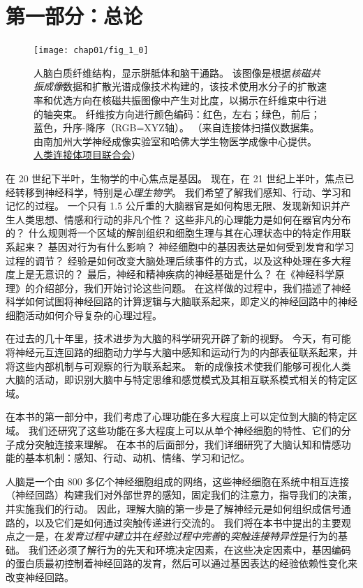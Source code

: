 \chapter*{第一部分：总论}

\begin{figure}[htbp]
	\centering
	\texttt{[image: chap01/fig\_1\_0]}
	\caption{人脑白质纤维结构，显示胼胝体和脑干通路。
		该图像是根据\textit{核磁共振成像}数据和扩散光谱成像技术构建的，该技术使用水分子的扩散速率和优选方向在核磁共振图像中产生对比度，以揭示在纤维束中行进的轴突束。
		纤维按方向进行颜色编码：红色，左右；绿色，前后；蓝色，升序-降序（RGB=XYZ轴）。
		（来自连接体扫描仪数据集。
		由南加州大学神经成像实验室和哈佛大学生物医学成像中心提供。
		\href{www.humanconnetomproject.org}{人类连接体项目联合会}）}
	\label{fig:1_0}
\end{figure}

在 20 世纪下半叶，生物学的中心焦点是基因。
现在，在 21 世纪上半叶，焦点已经转移到神经科学，特别是\textit{心理生物学}。
我们希望了解我们感知、行动、学习和记忆的过程。
一个只有 1.5 公斤重的大脑器官是如何构思无限、发现新知识并产生人类思想、情感和行动的非凡个性？
这些非凡的心理能力是如何在器官内分布的？
什么规则将一个区域的解剖组织和细胞生理与其在心理状态中的特定作用联系起来？
基因对行为有什么影响？
神经细胞中的基因表达是如何受到发育和学习过程的调节？
经验是如何改变大脑处理后续事件的方式，以及这种处理在多大程度上是无意识的？
最后，神经和精神疾病的神经基础是什么？
在《神经科学原理》的介绍部分，我们开始讨论这些问题。
在这样做的过程中，我们描述了神经科学如何试图将神经回路的计算逻辑与大脑联系起来，即定义的神经回路中的神经细胞活动如何介导复杂的心理过程。


在过去的几十年里，技术进步为大脑的科学研究开辟了新的视野。
今天，有可能将神经元互连回路的细胞动力学与大脑中感知和运动行为的内部表征联系起来，并将这些内部机制与可观察的行为联系起来。
新的成像技术使我们能够可视化人类大脑的活动，即识别大脑中与特定思维和感觉模式及其相互联系模式相关的特定区域。


在本书的第一部分中，我们考虑了心理功能在多大程度上可以定位到大脑的特定区域。
我们还研究了这些功能在多大程度上可以从单个神经细胞的特性、它们的分子成分突触连接来理解。
在本书的后面部分，我们详细研究了大脑认知和情感功能的基本机制：感知、行动、动机、情绪、学习和记忆。


人脑是一个由 800 多亿个神经细胞组成的网络，这些神经细胞在系统中相互连接（神经回路）构建我们对外部世界的感知，固定我们的注意力，指导我们的决策，并实施我们的行动。
因此，理解大脑的第一步是了解神经元是如何组织成信号通路的，以及它们是如何通过突触传递进行交流的。
我们将在本书中提出的主要观点之一是，在\textit{发育过程中建立}并在\textit{经验过程中完善}的\textit{突触连接特异性}是行为的基础。
我们还必须了解行为的先天和环境决定因素，在这些决定因素中，基因编码的蛋白质最初控制着神经回路的发育，然后可以通过基因表达的经验依赖性变化来改变神经回路。


